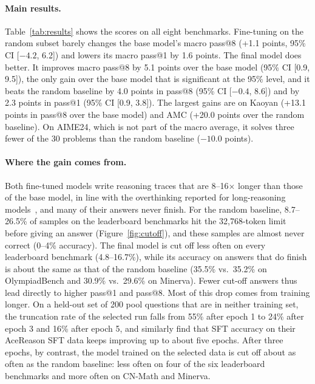 \documentclass{article}
\makeatletter
\newcommand{\passk}[1]{pass@#1}
\makeatother
\begin{document}
\paragraph{Main results.} Table~\ref{tab:results} shows the scores on all eight benchmarks. Fine-tuning on the random subset
barely changes the base model's macro \passk{8} (+1.1 points, 95\% CI [$-4.2$, 6.2]) and lowers its macro \passk{1} by 1.6
points. The final model does better. It improves macro \passk{8} by 5.1 points over the base model (95\% CI [0.9, 9.5]), the
only gain over the base model that is significant at the 95\% level, and it beats the random baseline by 4.0 points in
\passk{8} (95\% CI [$-0.4$, 8.6]) and by 2.3 points in \passk{1} (95\% CI [0.9, 3.8]). The largest gains are on Kaoyan
(+13.1 points in \passk{8} over the base model) and AMC (+20.0 points over the random baseline). On AIME24, which is not part
of the macro average, it solves three fewer of the 30 problems than the random baseline ($-10.0$ points).

\paragraph{Where the gain comes from.} Both fine-tuned models write reasoning traces that are 8--16$\times$ longer than those
of the base model, in line with the overthinking reported for long-reasoning models~\citep{chen2024overthinking}, and many of
their answers never finish. For the random baseline, 8.7--26.5\% of samples on the leaderboard benchmarks hit the
32,768-token limit before giving an answer (Figure~\ref{fig:cutoff}), and these samples are almost never correct (0--4\%
accuracy). The final model is cut off less often on every leaderboard benchmark (4.8--16.7\%), while its accuracy on answers
that do finish is about the same as that of the random baseline (35.5\% vs.\ 35.2\% on OlympiadBench and 30.9\% vs.\ 29.6\%
on Minerva). Fewer cut-off answers thus lead directly to higher \passk{1} and \passk{8}. Most of this drop comes from training
longer. On a held-out set of 200 pool questions that are in neither training set, the truncation rate of the selected run
falls from 55\% after epoch 1 to 24\% after epoch 3 and 16\% after epoch 5, and \citet{acereason11} similarly find that SFT
accuracy on their AceReason SFT data keeps improving up to about five epochs. After three epochs, by contrast, the model trained on the
selected data is cut off about as often as the random baseline: less often on four of the six leaderboard benchmarks and more
often on CN-Math and Minerva.
\end{document}
